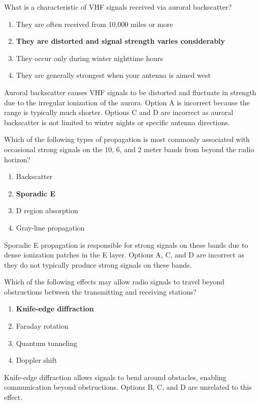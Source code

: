 
\begin{tcolorbox}[colback=gray!10!white,colframe=black!75!black,title={T3C03}]
    What is a characteristic of VHF signals received via auroral backscatter?
    \begin{enumerate}[label=\Alph*,noitemsep]
        \item They are often received from 10,000 miles or more
        \item \textbf{They are distorted and signal strength varies considerably}
        \item They occur only during winter nighttime hours
        \item They are generally strongest when your antenna is aimed west
    \end{enumerate}
\end{tcolorbox}
Auroral backscatter causes VHF signals to be distorted and fluctuate in strength due to the irregular ionization of the aurora. Option A is incorrect because the range is typically much shorter. Options C and D are incorrect as auroral backscatter is not limited to winter nights or specific antenna directions.


\begin{tcolorbox}[colback=gray!10!white,colframe=black!75!black,title={T3C04}]
    Which of the following types of propagation is most commonly associated with occasional strong signals on the 10, 6, and 2 meter bands from beyond the radio horizon?
    \begin{enumerate}[label=\Alph*,noitemsep]
        \item Backscatter
        \item \textbf{Sporadic E}
        \item D region absorption
        \item Gray-line propagation
    \end{enumerate}
\end{tcolorbox}
Sporadic E propagation is responsible for strong signals on these bands due to dense ionization patches in the E layer. Options A, C, and D are incorrect as they do not typically produce strong signals on these bands.


\begin{tcolorbox}[colback=gray!10!white,colframe=black!75!black,title={T3C05}]
    Which of the following effects may allow radio signals to travel beyond obstructions between the transmitting and receiving stations?
    \begin{enumerate}[label=\Alph*,noitemsep]
        \item \textbf{Knife-edge diffraction}
        \item Faraday rotation
        \item Quantum tunneling
        \item Doppler shift
    \end{enumerate}
\end{tcolorbox}
Knife-edge diffraction allows signals to bend around obstacles, enabling communication beyond obstructions. Options B, C, and D are unrelated to this effect.

